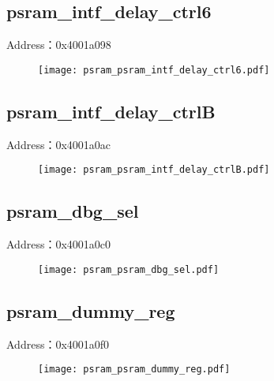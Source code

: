 \subsection{psram\_intf\_delay\_ctrl6}
\label{psram-psram-intf-delay-ctrl6}
Address：0x4001a098
 \begin{figure}[H]
\texttt{[image: psram\_psram\_intf\_delay\_ctrl6.pdf]}
\end{figure}

\subsection{psram\_intf\_delay\_ctrlB}
\label{psram-psram-intf-delay-ctrlB}
Address：0x4001a0ac
 \begin{figure}[H]
\texttt{[image: psram\_psram\_intf\_delay\_ctrlB.pdf]}
\end{figure}

\subsection{psram\_dbg\_sel}
\label{psram-psram-dbg-sel}
Address：0x4001a0c0
 \begin{figure}[H]
\texttt{[image: psram\_psram\_dbg\_sel.pdf]}
\end{figure}

\subsection{psram\_dummy\_reg}
\label{psram-psram-dummy-reg}
Address：0x4001a0f0
 \begin{figure}[H]
\texttt{[image: psram\_psram\_dummy\_reg.pdf]}
\end{figure}

